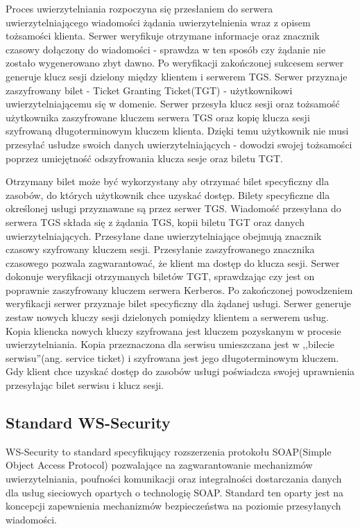 			Proces uwierzytelniania rozpoczyna się przesłaniem  do serwera uwierzytelniającego wiadomości żądania uwierzytelnienia wraz z opisem tożsamości klienta\cite{Garman03}. Serwer weryfikuje otrzymane informacje oraz znacznik czasowy dołączony do wiadomości - sprawdza w ten sposób czy żądanie nie zostało wygenerowano zbyt dawno. Po weryfikacji zakończonej sukcesem serwer generuje klucz sesji dzielony między klientem i serwerem TGS. Serwer przyznaje zaszyfrowany bilet - Ticket Granting Ticket(TGT) - użytkownikowi uwierzytelniającemu się w domenie. Serwer przesyła klucz sesji oraz tożsamość użytkownika zaszyfrowane kluczem serwera TGS   oraz kopię klucza sesji szyfrowaną długoterminowym kluczem klienta. Dzięki temu użytkownik nie musi przesyłać usłudze swoich danych uwierzytelniających - dowodzi swojej tożsamości poprzez umiejętność odszyfrowania klucza sesje oraz biletu TGT. 

			Otrzymany bilet może być wykorzystany aby otrzymać bilet specyficzny dla zasobów, do których użytkownik chce uzyskać dostęp. Bilety specyficzne dla określonej usługi przyznawane są przez serwer TGS. Wiadomość przesyłana do serwera TGS składa się z żądania TGS, kopii biletu TGT oraz danych uwierzytelniających. Przesyłane dane uwierzytelniające obejmują znacznik czasowy szyfrowany kluczem sesji. Przesyłanie zaszyfrowanego znacznika czasowego pozwala zagwarantować, że klient ma dostęp do klucza sesji. Serwer dokonuje weryfikacji otrzymanych biletów TGT, sprawdzając czy jest on poprawnie zaszyfrowany kluczem serwera Kerberos. Po zakończonej powodzeniem weryfikacji serwer przyznaje bilet specyficzny dla żądanej usługi. Serwer generuje zestaw nowych kluczy sesji dzielonych pomiędzy klientem a serwerem usług. Kopia kliencka nowych kluczy szyfrowana jest kluczem pozyskanym w procesie uwierzytelniania. Kopia przeznaczona dla serwisu umieszczana jest w ,,bilecie serwisu''(ang. service ticket) i  szyfrowana jest jego długoterminowym kluczem. Gdy klient chce uzyskać dostęp do zasobów usługi poświadcza swojej uprawnienia przesyłając bilet serwisu i klucz sesji.

	\subsection{Standard WS-Security}

		WS-Security to standard specyfikujący rozszerzenia protokołu SOAP(Simple Object Access Protocol) pozwalające na zagwarantowanie mechanizmów uwierzytelniania, poufności komunikacji oraz integralności dostarczania danych dla usług sieciowych opartych o technologię SOAP. Standard ten oparty jest na koncepcji zapewnienia mechanizmów bezpieczeństwa na poziomie przesyłanych wiadomości\cite{Hallam03}. 


